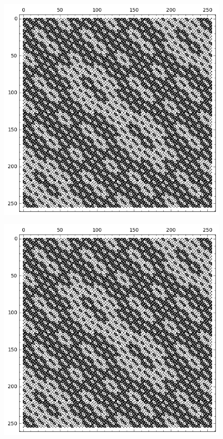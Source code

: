 \documentclass[12pt,a4paper]{article}
\begin{document}
\begin{figure}[!hb]
\centering
\begin{minipage}{.48\textwidth}
  \centering
  \includegraphics[width=.9\linewidth]{../matrix_plot/re8_1_weight_class_matrix.png}
  \label{fig:8_1_weight_class_matrix}
\end{minipage}%
\begin{minipage}{.48\textwidth}
  \centering
  \includegraphics[width=.9\linewidth]{../matrix_plot/re8_1_bent_cayley_graph_index_matrix.png}
  \label{fig:8_1_bent_cayley_graph_index_matrix}
\end{minipage}
\end{figure}
~
\end{document}
